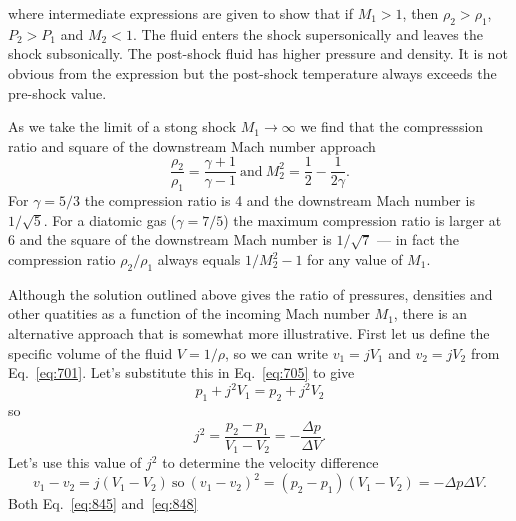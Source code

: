 where intermediate expressions are given to show that if $M_1>1$, then
$\rho_2>\rho_1$, $P_2>P_1$ and $M_2<1$.
The fluid enters the shock supersonically and leaves the
shock subsonically.  The post-shock fluid has higher pressure and
density.  It is not obvious from the expression but the post-shock
temperature always exceeds the pre-shock value.

As we take the limit of a stong shock $M_1 \rightarrow \infty$ we find
that the compresssion ratio and square of the downstream Mach number approach
\begin{equation}
\frac{\rho_2}{\rho_1} = \frac{\gamma+1}{\gamma-1}~\textrm{and}~M_2^2 = \frac{1}{2} - \frac{1}{2\gamma}.
\label{eq:707}
\end{equation}
For $\gamma=5/3$ the compression ratio is 4 and the downstream Mach
number is $1/\sqrt{5}$.  For a diatomic gas ($\gamma=7/5$) the maximum compression
ratio is larger at 6 and the square of the downstream Mach number is $1/\sqrt{7}$ --- in
fact the compression ratio $\rho_2/\rho_1$ always equals $1/M_2^2 -
1$ for any value of $M_1$.

Although the solution outlined above gives the ratio of pressures,
densities and other quatities as a function of the incoming Mach
number $M_1$, there is an alternative approach that is somewhat more
illustrative.   First let us define the specific volume of the fluid
$V=1/\rho$, so we can write $v_1=jV_1$ and $v_2=jV_2$ from
Eq.~\ref{eq:701}.  Let's substitute this in Eq.~\ref{eq:705} to give
\begin{equation}
p_1 + j^2 V_1 = p_2 + j^2 V_2
\label{eq:844}
\end{equation}
so 
\begin{equation}
j^2 = \frac{p_2-p_1}{V_1-V_2} = - \frac{\Delta p}{\Delta V}.
\label{eq:845}
\end{equation}
Let's use this value of $j^2$ to determine the velocity difference
\begin{equation}
v_1-v_2=j\left ( V_1 - V_2 \right )~\textrm{so}~\left
  (v_1-v_2\right)^2 = \left ( p_2 - p_1 \right ) \left (V_1 -
  V_2\right ) = -\Delta p \Delta V.
\label{eq:848}
\end{equation}
Both Eq.~\ref{eq:845} and~\ref{eq:848}

